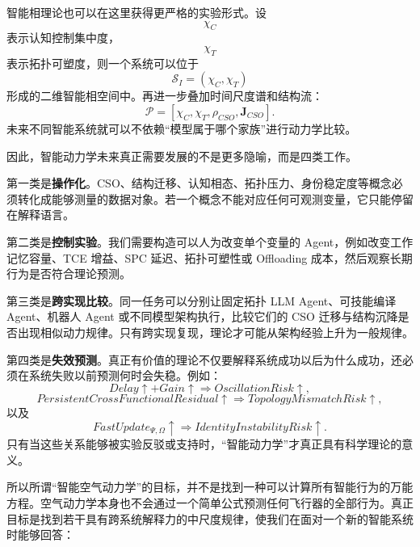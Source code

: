智能相理论也可以在这里获得更严格的实验形式。设
\begin{equation}
\chi_C
\end{equation}
表示认知控制集中度，
\begin{equation}
\chi_T
\end{equation}
表示拓扑可塑度，则一个系统可以位于
\begin{equation}
\mathcal{S}_{I}
=
(\chi_C,\chi_T)
\end{equation}
形成的二维智能相空间中。再进一步叠加时间尺度谱和结构流：
\begin{equation}
\mathcal{P}
=
\left[
\chi_C,
\chi_T,
\rho_{CSO},
\mathbf{J}_{CSO}
\right].
\end{equation}
未来不同智能系统就可以不依赖“模型属于哪个家族”进行动力学比较。

因此，智能动力学未来真正需要发展的不是更多隐喻，而是四类工作。

第一类是\textbf{操作化}。CSO、结构迁移、认知相态、拓扑压力、身份稳定度等概念必须转化成能够测量的数据对象。若一个概念不能对应任何可观测变量，它只能停留在解释语言。

第二类是\textbf{控制实验}。我们需要构造可以人为改变单个变量的 Agent，例如改变工作记忆容量、TCE 增益、SPC 延迟、拓扑可塑性或 Offloading 成本，然后观察长期行为是否符合理论预测。

第三类是\textbf{跨实现比较}。同一任务可以分别让固定拓扑 LLM Agent、可技能编译 Agent、机器人 Agent 或不同模型架构执行，比较它们的 CSO 迁移与结构沉降是否出现相似动力规律。只有跨实现复现，理论才可能从架构经验上升为一般规律。

第四类是\textbf{失效预测}。真正有价值的理论不仅要解释系统成功以后为什么成功，还必须在系统失败以前预测何时会失稳。例如：
\begin{equation}
Delay\uparrow
+
Gain\uparrow
\Rightarrow
OscillationRisk\uparrow,
\end{equation}
\begin{equation}
PersistentCrossFunctionalResidual\uparrow
\Rightarrow
TopologyMismatchRisk\uparrow,
\end{equation}
以及
\begin{equation}
FastUpdate_{\Psi,\Omega}\uparrow
\Rightarrow
IdentityInstabilityRisk\uparrow.
\end{equation}
只有当这些关系能够被实验反驳或支持时，“智能动力学”才真正具有科学理论的意义。

所以所谓“智能空气动力学”的目标，并不是找到一种可以计算所有智能行为的万能方程。空气动力学本身也不会通过一个简单公式预测任何飞行器的全部行为。真正目标是找到若干具有跨系统解释力的中尺度规律，使我们在面对一个新的智能系统时能够回答：

